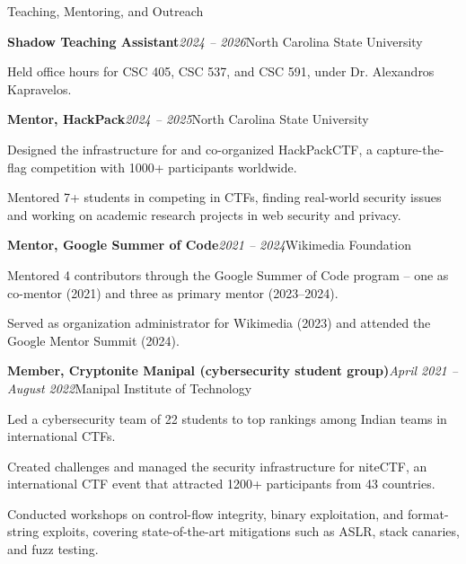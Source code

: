 \documentclass{resume} %
\begin{document}
\begin{rSection}{Teaching, Mentoring, and Outreach}
\begin{rSubsection}{\bf Shadow Teaching Assistant}{\em 2024 -- 2026}{North Carolina State University}{}
\item Held office hours for CSC 405, CSC 537, and CSC 591, under Dr. Alexandros Kapravelos.
\end{rSubsection}
\begin{rSubsection}{\bf Mentor, HackPack}{\em 2024 -- 2025}{North Carolina State University}{}
\item Designed the infrastructure for and co-organized HackPackCTF, a capture-the-flag competition with 1000+ participants worldwide.
\item Mentored 7+ students in competing in CTFs, finding real-world security issues and working on academic research projects in web security and privacy.
\end{rSubsection}
\begin{rSubsection}{\bf Mentor, Google Summer of Code}{\em 2021 -- 2024}{Wikimedia Foundation}{}
\item Mentored 4 contributors through the Google Summer of Code program -- one as co-mentor (2021) and three as primary mentor (2023--2024).
\item Served as organization administrator for Wikimedia (2023) and attended the Google Mentor Summit (2024).
\end{rSubsection}
\begin{rSubsection}{\bf Member, Cryptonite Manipal (cybersecurity student group)}{\em April 2021 -- August 2022}{Manipal Institute of Technology}{}
\item Led a cybersecurity team of 22 students to top rankings among Indian teams in international CTFs.
\item Created challenges and managed the security infrastructure for niteCTF, an international CTF event that attracted 1200+ participants from 43 countries.
\item Conducted workshops on control-flow integrity, binary exploitation, and format-string exploits, covering state-of-the-art mitigations such as ASLR, stack canaries, and fuzz testing.
\end{rSubsection}
\end{rSection}
\end{document}
